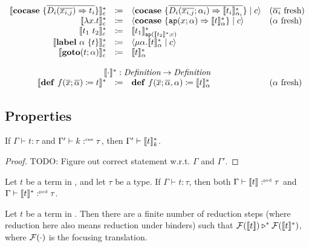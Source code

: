 \[\begin{array}{rcll}
    \translatestar{\cocase{\overline{D_i(\overline{x_{i,j}}) \Rightarrow t_i}}}{c} & \coloneq & \cut{\cocase{\overline{D_i(\overline{x_{i,j}}; \alpha_i) \Rightarrow \translatestar{t_i}{\alpha_i}}}}{c} & \fresh{\overline{\alpha_i}} \\
    \translatestar{\lambda x.t}{c} & \coloneq & \cut{\cocase{\mathtt{ap}(x; \alpha) \Rightarrow \translatestar{t}{\alpha}}}{c} & \fresh{\alpha} \\
    \translatestar{t_1\ t_2}{c} & \coloneq & \translatestar{t_1}{\mathtt{ap}(\translatestar{t_2}{}; c)} & \\
    \translatestar{\lab{\alpha}{t}}{c} & \coloneq & \cut{\mu \alpha.\translatestar{t}{\alpha}}{c} & \\
    \translatestar{\goto{t}{\alpha}}{c} & \coloneq & \translatestar{t}{\alpha} & \\
    \\
    \multicolumn{4}{c}{\translatestar{\cdot}{} : \emph{Definition} \rightarrow \emph{Definition}}\\
    \translatestar{\defi{f(\overline{x}; \overline{\alpha})}{t}}{} & \coloneq & \defi{f(\overline{x}; \overline{\alpha}, \alpha)}{\translatestar{t}{\alpha}} & \fresh{\alpha}
  \end{array}
\]

\subsection{Properties}
\label{subsec:translation:properties}

\begin{lemma}
  If $\Gamma \vdash t : \tau$ and $\Gamma' \vdash k :^{\text{\tiny cns}} \tau$, then $\Gamma' \vdash \llbracket t \rrbracket_{k}^{\ast}$.
\end{lemma}
\begin{proof}
  TODO: Figure out correct statement w.r.t. $\Gamma$ and $\Gamma'$.
\end{proof}

\begin{theorem}
  Let $t$ be a term in \surfacelang, and let $\tau$ be a type.
  If $\Gamma \vdash t: \tau$, then both $\Gamma \vdash \llbracket t \rrbracket :^{\text{\tiny prd}} \tau$ and $\Gamma \vdash \llbracket t \rrbracket_{}^{\ast} :^{\text{\tiny prd}} \tau$.
\end{theorem}

\begin{theorem}[Correctness]
  Let $t$ be a term in \surfacelang. Then there are a finite number of reduction steps (where reduction here also means reduction under binders) such that $\mathcal{F}(\llbracket t \rrbracket) \triangleright^{\ast} \mathcal{F}(\llbracket t \rrbracket_{}^{\ast})$, where $\mathcal{F}(\cdot)$ is the focusing translation.
\end{theorem}
